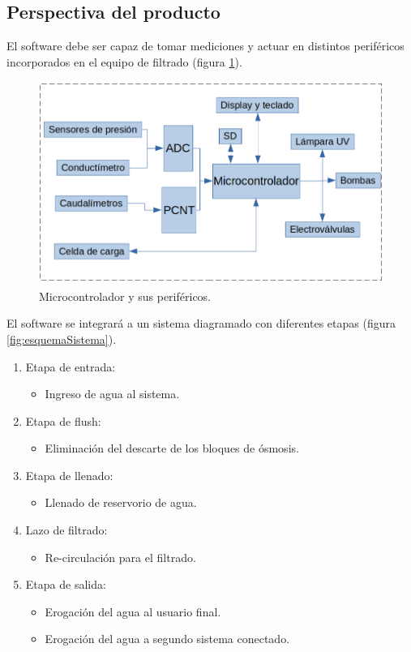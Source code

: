 \documentclass[
11pt, %
]{charter}
\begin{document}
\subsection{Perspectiva del producto}
El software debe ser capaz de tomar mediciones y actuar en distintos periféricos incorporados en el equipo de filtrado (figura \ref{fig:microcontroladorConexiones}).
\begin{figure}[!htb]
\centering 
\includegraphics[width=.7\textwidth]{./Figuras/Microcontrolador y sus perifericos.png}
\caption{Microcontrolador y sus periféricos.}
\label{fig:microcontroladorConexiones}
\end{figure}

El software se integrará a un sistema diagramado con diferentes etapas (figura \ref{fig:esquemaSistema}).

\begin{enumerate}
	\item Etapa de entrada:
		\begin{itemize}
			\item Ingreso de agua al sistema.
		\end{itemize}
	\item Etapa de flush:
		\begin{itemize}
			\item Eliminación del descarte de los bloques de ósmosis.
		\end{itemize}
	\item Etapa de llenado:
		\begin{itemize}
			\item Llenado de reservorio de agua.
		\end{itemize}
	\item Lazo de filtrado:
		\begin{itemize}
			\item Re-circulación para el filtrado.
		\end{itemize}
	\item Etapa de salida:
		\begin{itemize}
			\item Erogación del agua al usuario final.
			\item Erogación del agua a segundo sistema conectado.
		\end{itemize}

\end{enumerate}
\end{document}
